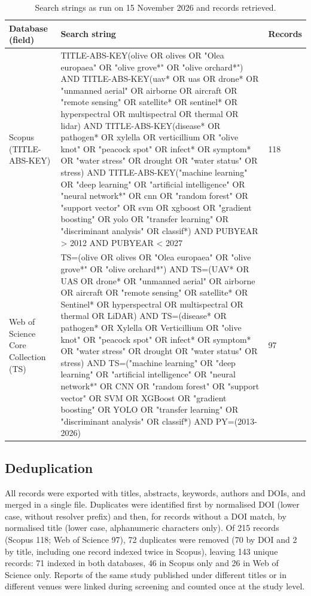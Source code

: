 \documentclass[preprint,12pt]{elsarticle}
\begin{document}
\begin{table}[H]\centering\caption{Search strings as run on 15 November 2026 and records retrieved.}\label{tab:search}\footnotesize
\begin{tabular}{@{}L{1.80cm}L{9.61cm}L{1.03cm}@{}}\toprule
Database (field) & Search string & Records\\\midrule
Scopus (TITLE-ABS-KEY) & \ttfamily TITLE-ABS-KEY(olive OR olives OR "Olea europaea" OR "olive grove*" OR "olive orchard*") AND TITLE-ABS-KEY(uav* OR uas OR drone* OR "unmanned aerial" OR airborne OR aircraft OR "remote sensing" OR satellite* OR sentinel* OR hyperspectral OR multispectral OR thermal OR lidar) AND TITLE-ABS-KEY(disease* OR pathogen* OR xylella OR verticillium OR "olive knot" OR "peacock spot" OR infect* OR symptom* OR "water stress" OR drought OR "water status" OR stress) AND TITLE-ABS-KEY("machine learning" OR "deep learning" OR "artificial intelligence" OR "neural network*" OR cnn OR "random forest" OR "support vector" OR svm OR xgboost OR "gradient boosting" OR yolo OR "transfer learning" OR "discriminant analysis" OR classif*) AND PUBYEAR > 2012 AND PUBYEAR < 2027 & 118\\[2pt]
Web of Science Core Collection (TS) & \ttfamily TS=(olive OR olives OR "Olea europaea" OR "olive grove*" OR "olive orchard*") AND TS=(UAV* OR UAS OR drone* OR "unmanned aerial" OR airborne OR aircraft OR "remote sensing" OR satellite* OR Sentinel* OR hyperspectral OR multispectral OR thermal OR LiDAR) AND TS=(disease* OR pathogen* OR Xylella OR Verticillium OR "olive knot" OR "peacock spot" OR infect* OR symptom* OR "water stress" OR drought OR "water status" OR stress) AND TS=("machine learning" OR "deep learning" OR "artificial intelligence" OR "neural network*" OR CNN OR "random forest" OR "support vector" OR SVM OR XGBoost OR "gradient boosting" OR YOLO OR "transfer learning" OR "discriminant analysis" OR classif*) AND PY=(2013-2026) & 97\\\bottomrule
\end{tabular}\end{table}
 
\subsection{Deduplication}
All records were exported with titles, abstracts, keywords, authors and DOIs, and merged in a single file. Duplicates were identified first by normalised DOI (lower case, without resolver prefix) and then, for records without a DOI match, by normalised title (lower case, alphanumeric characters only). Of 215 records (Scopus 118; Web of Science 97), 72 duplicates were removed (70 by DOI and 2 by title, including one record indexed twice in Scopus), leaving 143 unique records: 71 indexed in both databases, 46 in Scopus only and 26 in Web of Science only. Reports of the same study published under different titles or in different venues were linked during screening and counted once at the study level.
 
\end{document}
